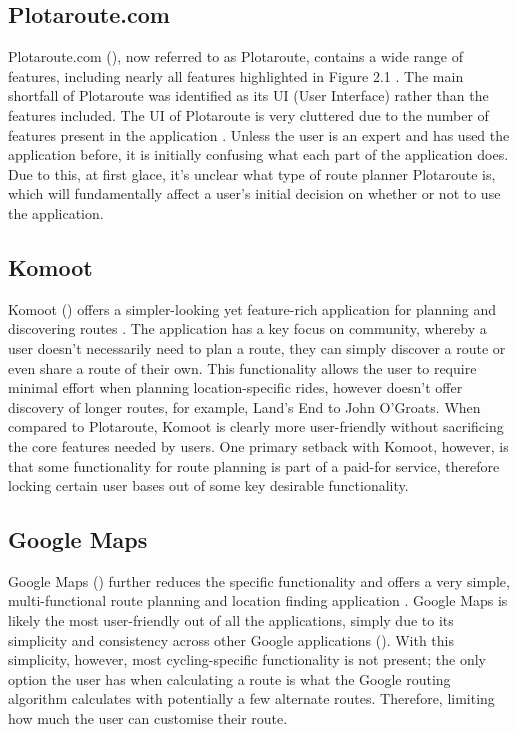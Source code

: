 \subsection{Plotaroute.com}
\label{litrev:plotaroute}
Plotaroute.com (\cite{noauthor_free_nodate}), now referred to as Plotaroute, contains a wide range of features, including nearly all features highlighted in Figure 2.1 . The main shortfall of Plotaroute was identified as its UI (User Interface) rather than the features included. The UI of Plotaroute is very cluttered due to the number of features present in the application . Unless the user is an expert and has used the application before, it is initially confusing what each part of the application does. Due to this, at first glace, it's unclear what type of route planner Plotaroute is, which will fundamentally affect a user's initial decision on whether or not to use the application.

\subsection{Komoot}
\label{litrev:komoot}
Komoot (\cite{noauthor_komoot_nodate}) offers a simpler-looking yet feature-rich application for planning and discovering routes . The application has a key focus on community, whereby a user doesn't necessarily need to plan a route, they can simply discover a route or even share a route of their own. This functionality allows the user to require minimal effort when planning location-specific rides, however doesn't offer discovery of longer routes, for example, Land's End to John O'Groats. When compared to Plotaroute, Komoot is clearly more user-friendly without sacrificing the core features needed by users. One primary setback with Komoot, however, is that some functionality for route planning is part of a paid-for service, therefore locking certain user bases out of some key desirable functionality.

\subsection{Google Maps}
\label{litrev:gmaps}

Google Maps (\cite{noauthor_google_nodate}) further reduces the specific functionality and offers a very simple, multi-functional route planning and location finding application . Google Maps is likely the most user-friendly out of all the applications, simply due to its simplicity and consistency across other Google applications (\cite{noauthor_material_nodate}). With this simplicity, however, most cycling-specific functionality is not present; the only option the user has when calculating a route is what the Google routing algorithm calculates with potentially a few alternate routes. Therefore, limiting how much the user can customise their route.

